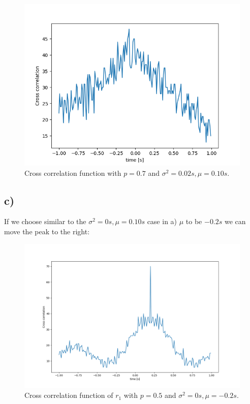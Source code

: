 \begin{figure}[H]
\centering
\includegraphics[scale=0.7]{2_b_p=0_7_2_10.png}
\caption{Cross correlation function with $p=0.7$ and $\sigma^2 = 0.02s, \mu = 0.10s$.}
\end{figure}

\subsection*{c)}
If we choose similar to the $\sigma^2 = 0s, \mu = 0.10s$ case in a) $\mu$ to be $-0.2s$ we can move the peak to the right:

\begin{figure}[H]
\centering
\includegraphics[scale=0.4]{2_c_p=0_5.png}
\caption{Cross correlation function of $r_1$ with $p=0.5$ and $\sigma^2 = 0s, \mu = -0.2s$.}
\end{figure}

